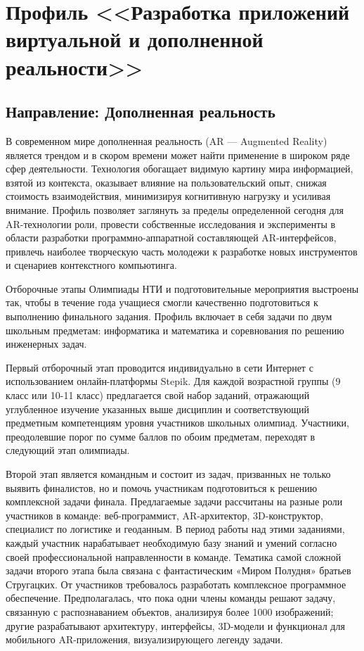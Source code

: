 

\chapter{Профиль <<Разработка приложений виртуальной и дополненной реальности>>}

\section*{Направление: Дополненная реальность}

В современном мире дополненная реальность (AR — Augmented Reality) является трендом и в скором времени может найти применение в широком ряде сфер деятельности. Технология обогащает видимую картину мира информацией, взятой из контекста, оказывает влияние на пользовательский опыт, снижая стоимость взаимодействия, минимизируя когнитивную нагрузку и усиливая внимание. Профиль позволяет заглянуть за пределы определенной сегодня для AR-технологии роли, провести собственные исследования и эксперименты в области разработки программно-аппаратной составляющей AR-интерфейсов, привлечь наиболее творческую часть молодежи к разработке новых инструментов и сценариев контекстного компьютинга.

Отборочные этапы Олимпиады НТИ и подготовительные мероприятия выстроены так, чтобы в течение года учащиеся смогли качественно подготовиться к выполнению финального задания. Профиль включает в себя задачи по двум школьным предметам: информатика и математика и соревнования по решению инженерных задач. 

Первый отборочный этап проводится индивидуально в сети Интернет с использованием онлайн-платформы Stepik. Для каждой возрастной группы (9 класс или 10-11 класс) предлагается свой набор заданий, отражающий углубленное изучение указанных выше дисциплин и соответствующий предметным компетенциям уровня участников школьных олимпиад. Участники, преодолевшие порог по сумме баллов по обоим предметам, переходят в следующий этап олимпиады.

Второй этап является командным и состоит из задач, призванных не только выявить финалистов, но и помочь участникам подготовиться к решению комплексной задачи финала. Предлагаемые задачи рассчитаны на разные роли участников в команде: веб-программист, AR-архитектор, 3D-конструктор, специалист по логистике и геоданным. В период работы над этими заданиями, каждый участник нарабатывает необходимую базу знаний и умений согласно своей профессиональной направленности в команде. Тематика самой сложной задачи второго этапа была связана с фантастическим «Миром Полудня» братьев Стругацких. От участников требовалось разработать комплексное программное обеспечение. Предполагалась, что пока одни члены команды решают задачу, связанную с распознаванием объектов, анализируя более 1000 изображений; другие разрабатывают архитектуру, интерфейсы, 3D-модели и функционал для мобильного AR-приложения, визуализирующего легенду задачи.

